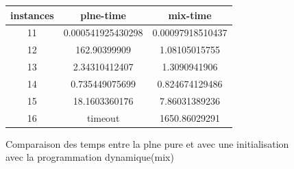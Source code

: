 \documentclass[a4paper]{memoir}
\begin{document}
\begin{figure}
\begin{tabular}{|c||c||c|}
\hline
instances & plne-time & mix-time \\ 
\hline
11 & 0.000541925430298 & 0.00097918510437 \\ 
\hline
12 & 162.90399909 & 1.08105015755 \\ 
\hline
13 & 2.34310412407 & 1.3090941906 \\ 
\hline
14 & 0.735449075699 & 0.824674129486 \\ 
\hline
15 & 18.1603360176 & 7.86031389236 \\ 
\hline
16 & timeout & 1650.86029291 \\ 
\hline
\end{tabular}


\caption{Comparaison des temps entre la plne pure et avec une initialisation avec la programmation dynamique(mix)}
\end{figure}

    
     
\end{document}
